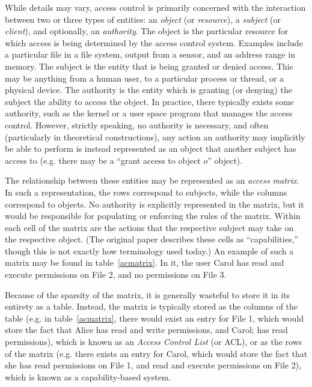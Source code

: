 While details may vary, access control is primarily concerned with the interaction between two or three types of entities: an {\em object} (or {\em resource}), a {\em subject} (or {\em client}), and optionally, an {\em authority}. The object is the particular resource for which access is being determined by the access control system. Examples include a particular file in a file system, output from a sensor, and an address range in memory. The subject is the entity that is being granted or denied access. This may be anything from a human user, to a particular process or thread, or a physical device. The authority is the entity which is granting (or denying) the subject the ability to access the object. In practice, there typically exists some authority, such as the kernel or a user space program that manages the access control. However, strictly speaking, no authority is necessary, and often (particularly in theoretical constructions), any action an authority may implicitly be able to perform is instead represented as an object that another subject has access to (e.g. there may be a ``grant access to object $o$'' object).

The relationship between these entities may be represented as an {\em access matrix}.\cite{lampson1971} In such a representation, the rows correspond to subjects, while the columns correspond to objects. No authority is explicitly represented in the matrix, but it would be responsible for populating or enforcing the rules of the matrix. Within each cell of the matrix are the actions that the respective subject may take on the respective object. (The original paper describes these cells as ``capabilities,'' though this is not exactly how terminology used today.) An example of such a matrix may be found in table~\ref{acmatrix}. In it, the user Carol has read and execute permissions on File 2, and no permissions on File 3. 

Because of the sparsity of the matrix, it is generally wasteful to store it in its entirety as a table. Instead, the matrix is typically stored as the columns of the table (e.g. in table~\ref{acmatrix}, there would exist an entry for File 1, which would store the fact that Alice has read and write permissions, and Carol; has read permissions), which is known as an {\em Access Control List} (or ACL), or as the rows of the matrix (e.g. there exists an entry for Carol, which would store the fact that she has read permissions on File 1, and read and execute permissions on File 2), which is known as a capability-based system.

